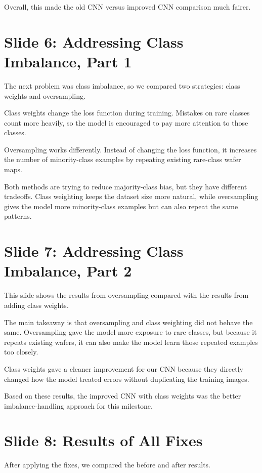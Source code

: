 \documentclass[11pt]{article}
\begin{document}
Overall, this made the old CNN versus improved CNN comparison much fairer.

\section*{Slide 6: Addressing Class Imbalance, Part 1}

The next problem was class imbalance, so we compared two strategies: class weights and oversampling.

Class weights change the loss function during training. Mistakes on rare classes count more heavily, so the model is encouraged to pay more attention to those classes.

Oversampling works differently. Instead of changing the loss function, it increases the number of minority-class examples by repeating existing rare-class wafer maps.

Both methods are trying to reduce majority-class bias, but they have different tradeoffs. Class weighting keeps the dataset size more natural, while oversampling gives the model more minority-class examples but can also repeat the same patterns.

\section*{Slide 7: Addressing Class Imbalance, Part 2}

This slide shows the results from oversampling compared with the results from adding class weights.

The main takeaway is that oversampling and class weighting did not behave the same. Oversampling gave the model more exposure to rare classes, but because it repeats existing wafers, it can also make the model learn those repeated examples too closely.

Class weights gave a cleaner improvement for our CNN because they directly changed how the model treated errors without duplicating the training images.

Based on these results, the improved CNN with class weights was the better imbalance-handling approach for this milestone.

\section*{Slide 8: Results of All Fixes}

After applying the fixes, we compared the before and after results.
\end{document}
